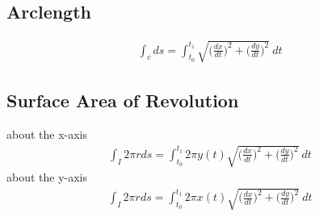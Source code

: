 \documentclass{article}
\theoremstyle{mytheoremstyle}
\theoremstyle{mytheoremstyle}
\theoremstyle{myproblemstyle}
\begin{document}
    \subsection*{Arclength}
    \begin{align*}
        \int_c ds = \int_{t_0}^{t_1} \sqrt{\Big(\frac{dx}{dt}\Big)^2 + \Big(\frac{dy}{dt}\Big)^2} \ dt
    \end{align*}

    \subsection*{Surface Area of Revolution}
    about the x-axis
    \begin{align*}
        \int_I 2\pi r ds = \int_{t_0}^{t_1} 2\pi y(t) \sqrt{\Big(\frac{dx}{dt}\Big)^2 + \Big(\frac{dy}{dt}\Big)^2} \ dt
    \end{align*}
    about the y-axis
    \begin{align*}
        \int_I 2\pi r ds = \int_{t_0}^{t_1} 2\pi x(t) \sqrt{\Big(\frac{dx}{dt}\Big)^2 + \Big(\frac{dy}{dt}\Big)^2} \ dt
    \end{align*}
\end{document}
